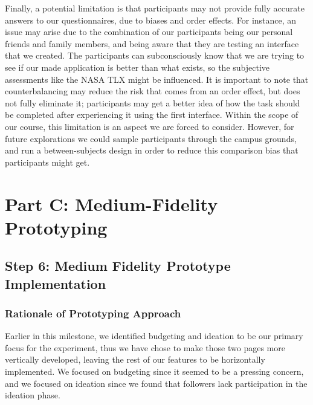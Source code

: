 \documentclass[12pt,a4paper]{article}
\begin{document}
\par
\indent
Finally, a potential limitation is that participants may not provide fully accurate answers to our questionnaires, due to biases and order effects. For instance, an issue may arise due to the combination of our participants being our personal friends and family members, and being aware that they are testing an interface that we created. The participants can subconsciously know that we are trying to see if our made application is better than what exists, so the subjective assessments like the NASA TLX might be influenced. It is important to note that counterbalancing may reduce the risk that comes from an order effect, but does not fully eliminate it; participants may get a better idea of how the task should be completed after experiencing it using the first interface. Within the scope of our course, this limitation is an aspect we are forced to consider. However, for future explorations we could sample participants through the campus grounds, and run a between-subjects design in order to reduce this comparison bias that participants might get. 



\newpage

\section{Part C: Medium-Fidelity Prototyping}
\subsection{Step 6: Medium Fidelity Prototype Implementation}

\subsubsection{Rationale of Prototyping Approach}

Earlier in this milestone, we identified budgeting and ideation to be our primary focus for the experiment, thus we have chose to make those two pages more vertically developed, leaving the rest of our features to be horizontally implemented. We focused on budgeting since it seemed to be a pressing concern, and we focused on ideation since we found that followers lack participation in the ideation phase. \newline
\end{document}
